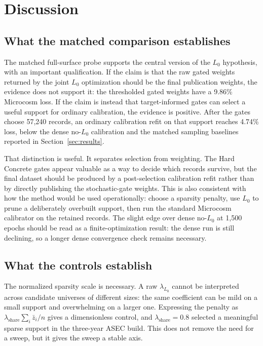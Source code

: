 \section{Discussion}
\label{sec:discussion}

\subsection{What the matched comparison establishes}

The matched full-surface probe supports the central version of the $L_0$ hypothesis, with an important
qualification. If the claim is that the raw gated weights returned by the joint $L_0$ optimization should
be the final publication weights, the evidence does not support it: the thresholded gated weights have a
9.86\% Microcosm loss. If the claim is instead that target-informed gates can select a useful support for
ordinary calibration, the evidence is positive. After the gates choose 57{,}240 records, an ordinary
calibration refit on that support reaches 4.74\% loss, below the dense no-$L_0$ calibration and the
matched sampling baselines reported in Section~\ref{sec:results}.

That distinction is useful. It separates selection from weighting. The Hard Concrete gates appear valuable
as a way to decide which records survive, but the final dataset should be produced by a post-selection
calibration refit rather than by directly publishing the stochastic-gate weights. This is also consistent
with how the method would be used operationally: choose a sparsity penalty, use $L_0$ to prune a
deliberately overbuilt support, then run the standard Microcosm calibrator on the retained records. The
slight edge over dense no-$L_0$ at 1{,}500 epochs should be read as a finite-optimization result: the
dense run is still declining, so a longer dense convergence check remains necessary.

\subsection{What the controls establish}

The normalized sparsity scale is necessary. A raw $\lambda_{L_0}$ cannot be interpreted across candidate
universes of different sizes: the same coefficient can be mild on a small support and overwhelming on a
larger one. Expressing the penalty as
$\lambda_{\mathrm{share}}\sum_i\bar{z}_i/n$ gives a dimensionless control, and
$\lambda_{\mathrm{share}}=0.8$ selected a meaningful sparse support in the three-year ASEC build. This does
not remove the need for a sweep, but it gives the sweep a stable axis.

